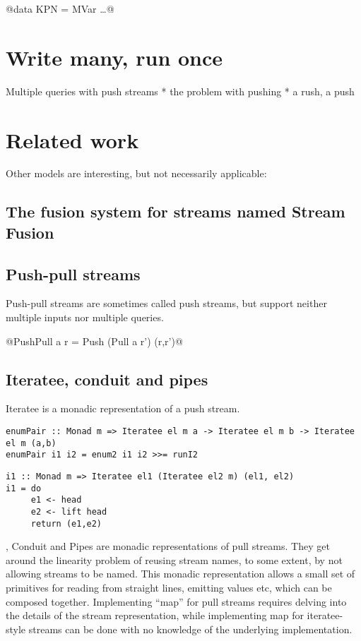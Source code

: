 @data KPN = MVar …@

\section{Write many, run once}
Multiple queries with push streams
* the problem with pushing
* a rush, a push


\section{Related work}
Other models are interesting, but not necessarily applicable:

\subsection{The fusion system for streams named Stream Fusion}

\subsection{Push-pull streams}
Push-pull streams are sometimes called push streams, but support neither multiple inputs nor multiple queries.

@PushPull a r = Push (Pull a r') (r,r')@

\subsection{Iteratee, conduit and pipes}
Iteratee is a monadic representation of a push stream.
\begin{lstlisting}
enumPair :: Monad m => Iteratee el m a -> Iteratee el m b -> Iteratee el m (a,b)
enumPair i1 i2 = enum2 i1 i2 >>= runI2
\end{lstlisting}

\begin{lstlisting}
i1 :: Monad m => Iteratee el1 (Iteratee el2 m) (el1, el2)
i1 = do
     e1 <- head 
     e2 <- lift head
     return (e1,e2)
\end{lstlisting}


, Conduit and Pipes are monadic representations of pull streams.
They get around the linearity problem of reusing stream names, to some extent, by not allowing streams to be named.
This monadic representation allows a small set of primitives for reading from straight lines, emitting values etc, which can be composed together.
Implementing ``map'' for pull streams requires delving into the details of the stream representation, while implementing map for iteratee-style streams can be done with no knowledge of the underlying implementation.

